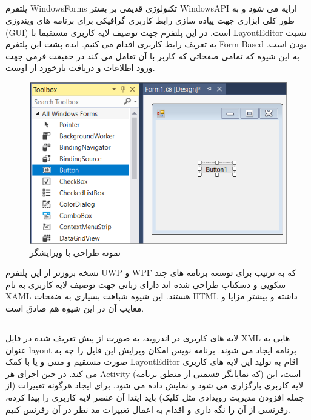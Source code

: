 \documentclass{CSICC2020}
\begin{document}
\subsection{}
\label{WindowsForms}
پلتفرم WindowsForms تکنولوژی قدیمی بر بستر WindowsAPI ارایه می شود و به طور کلی ابزاری جهت پیاده سازی رابط کاربری گرافیکی برای برنامه های ویندوزی (GUI) است.
در این پلتفرم جهت توصیف لایه کاربری مستقیما با LayoutEditor نسبت به تعریف رابط کاربری اقدام می کنیم.
ایده پشت این پلتفرم Form-Based بودن است. به این شیوه که تمامی صفحاتی که کاربر با آن تعامل می کند در حقیقت فرمی جهت ورود اطلاعات و دریافت بازخورد از اوست.

\begin{figure}[h!]
\includegraphics[width=\linewidth]{Images/winform}
\caption{نمونه طراحی با ویرایشگر }
\label{fig:WinForm}
\end{figure}

نسخه بروزتر از این پلتفرم UWP و WPF که به ترتیب برای توسعه برنامه های چند سکویی و دسکتاپ طراحی شده اند دارای زبانی جهت توصیف لایه کاربری به نام XAML هستند.
 این شیوه شباهت بسیاری به ضفحات HTML داشته و بیشتر مزایا و معایب آن در این شیوه هم صادق است.
\cite{winform}


\subsection{}
\label{Android}
لایه های کاربری در اندروید، به صورت از پیش تعریف شده در فایل XML هایی به عنوان layout برنامه ایجاد می شوند. برنامه نویس امکان ویرایش این فایل را چه به صورت مستقیم و متنی و یا با کمک LayoutEditor اقام به تولید این لایه های کاربری می کند.
در حین اجرای هر Activity (که نمایانگر قسمتی از منطق برنامه) است، این لایه کاربری بارگزاری می شود و نمایش داده می شود.
برای ایجاد هرگونه تغییرات (از جمله افزودن مدیریت رویدادی مثل کلیک) باید ایتدا آن عنصر لایه کاربری را پیدا کرده، رفرنسی از آن را نگه داری و اقدام به اعمال تغییرات مد نظر در آن رفرنس کنیم.\cite{androidlayout}
\end{document}
